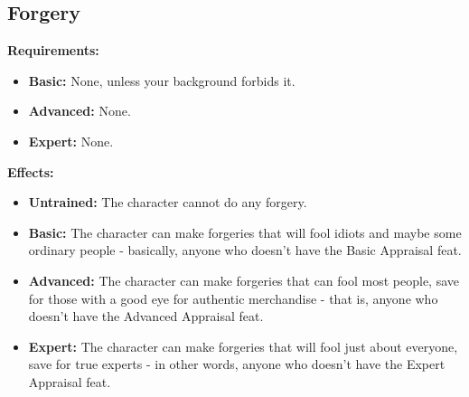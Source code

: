 \subsection{Forgery}
\begin{table}[!ht]
\centering
{}
\end{table}
\textbf{Requirements:}
\begin{itemize}
	\item \textbf{Basic:} None, unless your background forbids it.
	\item \textbf{Advanced:} None.
	\item \textbf{Expert:} None.
\end{itemize}
\textbf{Effects:}
\begin{itemize}
	\item \textbf{Untrained:} The character cannot do any forgery.
	\item \textbf{Basic:} The character can make forgeries that will fool idiots and maybe some ordinary people - basically, anyone who doesn't have the Basic Appraisal feat.
	\item \textbf{Advanced:} The character can make forgeries that can fool most people, save for those with a good eye for authentic merchandise - that is, anyone who doesn't have the Advanced Appraisal feat.
	\item \textbf{Expert:} The character can make forgeries that will fool just about everyone, save for true experts -  in other words, anyone who doesn't have the Expert Appraisal feat.
\end{itemize}\newpage
